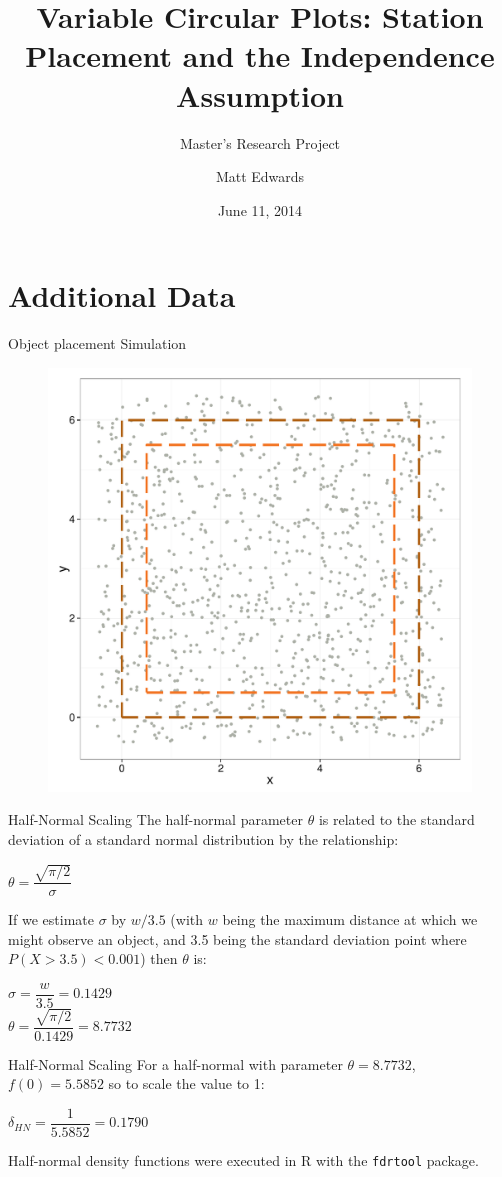 \documentclass{beamer}
\title{Variable Circular Plots: Station Placement and the Independence Assumption}
\subtitle{Master's Research Project}
\author{Matt Edwards}
\date{June 11, 2014}
\begin{document}
\section{Additional Data}
\begin{frame}{Object placement Simulation}

	\begin{figure}
		\centering
		\includegraphics[height=.80\textheight]{../images/slides-pointGeneration.pdf}
	\end{figure}
\end{frame}

\begin{frame}{Half-Normal Scaling}
	The half-normal parameter $\theta$ is related to the standard deviation of a standard normal distribution by the relationship: 
	\begin{center}
	$\theta = \dfrac{\sqrt{\pi /2}}{\sigma}$
	\end{center}
	
	
	If we estimate $\sigma$ by $w/3.5$ (with $w$ being the maximum distance at which we might observe an object, and 3.5 being the standard deviation point where $P(X > 3.5) < 0.001$) then $\theta$ is:
	\begin{center}
	$\sigma = \dfrac{w}{3.5} = 0.1429$\\
	\vspace{0.5cm}
	$\theta = \dfrac{\sqrt{\pi /2}}{0.1429}=8.7732$
	\end{center}
\end{frame}

\begin{frame}{Half-Normal Scaling}
	For a half-normal with parameter $\theta=8.7732$, $f(0)=5.5852$ so to scale the value to 1:
	\begin{center}
	$\delta_{HN} = \dfrac{1}{5.5852} = 0.1790$
	\end{center}
	
	
	Half-normal density functions were executed in R with the \texttt{fdrtool} package.
\end{frame}
\end{document}
